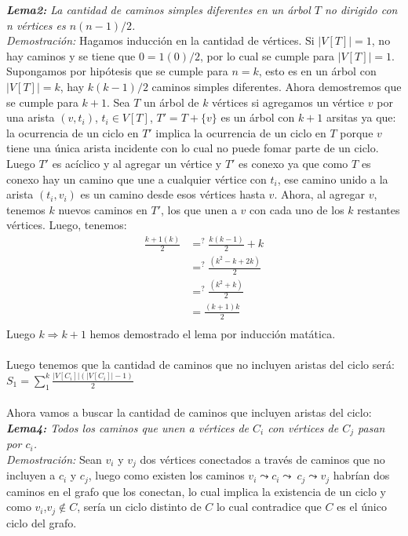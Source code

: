 \documentclass[12pt]{article}
\begin{document}
\textit{\textbf{Lema2:}
La cantidad de caminos simples diferentes en un \'arbol $T$ no dirigido con n v\'ertices es $n(n-1)/2$.}\\
\textit{Demostraci\'on:} Hagamos inducci\'on en la cantidad de v\'ertices. Si $|V[T]|=1$, no hay caminos y se tiene que 
$0 = 1(0)/2$, por lo cual se cumple para  $|V[T]| = 1$. Supongamos por hip\'otesis que se cumple para $n = k$, esto es en un \'arbol con
 $|V[T]| = k$, hay $k(k-1)/2$ caminos simples diferentes. Ahora demostremos que se cumple para $k+1$. Sea $T$ un \'arbol de $k$ v\'ertices si
 agregamos un v\'ertice $v$ por una arista $(v,t_i)$, $t_i\in V[T]$, $T'=T+\{v\}$ es un \'arbol con $k+1$ arsitas ya que: la ocurrencia de un ciclo en $T'$ implica la ocurrencia de un ciclo en $T$ porque $v$ tiene una \'unica arista incidente con lo cual no puede fomar parte de un ciclo. Luego $T'$ es ac\'iclico y al agregar un v\'ertice  y $T'$ es conexo ya que como $T$ es conexo hay un camino que une a cualquier v\'ertice con $t_i$, ese camino unido a la arista $(t_i,v_i)$ es un camino desde esos v\'ertices hasta $v$. Ahora, al agregar $v$, tenemos 
$k$ nuevos caminos en $T'$, los que unen a $v$ con cada uno de los $k$ restantes v\'ertices. Luego, tenemos:\\
\begin{equation}
 \begin{split}
\frac{k+1(k)}{2} &=^? \frac{k(k-1)}{2} + k\\
 		         &=^? \frac{(k^2-k+2k)}{2}\\
 		         &=^? \frac{(k^2+k)}{2}\\
 		         &= \frac{(k+1)k}{2}\\
  \end{split}
\end{equation}
Luego $k\Rightarrow k+1$ hemos demostrado el lema por inducci\'on mat\'atica.\\
\\

Luego tenemos que la cantidad de caminos que no incluyen aristas del ciclo ser\'a:\\

$S_1 = \sum\limits_{1}^{k} \frac{|V[C_i]|(|V[C_i]|-1)}{2} $\\
\\
 

Ahora vamos a buscar la cantidad de caminos que incluyen aristas del ciclo:\\

\textit{\textbf{Lema4:}
Todos los caminos que unen a v\'ertices de $C_i$ con v\'ertices de $C_j$ pasan por $c_i$.}\\
\textit{Demostraci\'on:} Sean $v_i$ y $v_j$ dos v\'ertices conectados a trav\'es de caminos que no incluyen a $c_i$ y $c_j$, luego como existen los caminos $v_i\leadsto c_i\leadsto \ c_j\leadsto v_j$ habr\'ian dos caminos en el grafo que los conectan, lo cual implica la existencia de un ciclo y como $v_i$,$v_j\notin C$, ser\'ia un ciclo distinto de $C$ lo cual contradice que $C$ es el \'unico ciclo del grafo.\\
\\ 
\end{document}
